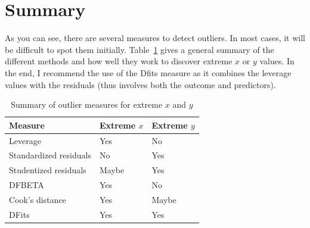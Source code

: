\section{Summary}

As you can see, there are several measures to detect outliers. In most cases, it will be difficult to spot them initially. Table~\ref{tab:outsum} gives a general summary of the different methods and how well they work to discover extreme $x$ or $y$ values. In the end, I recommend the use of the Dfits measure as it combines the leverage values with the residuals (thus involves both the outcome and predictors).

\begin{table}[htbp]\centering
\caption{Summary of outlier measures for extreme $x$ and $y$
\label{tab:outsum}}
\begin{tabular}{lll}
\hline
Measure & Extreme $x$ & Extreme $y$ \\
\hline
Leverage & Yes & No \\
Standardized residuals & No & Yes \\
Studentized residuals & Maybe & Yes \\
DFBETA & Yes & No \\
Cook's distance & Yes & Maybe \\
DFits & Yes & Yes \\
\hline
\end{tabular}
\end{table}
